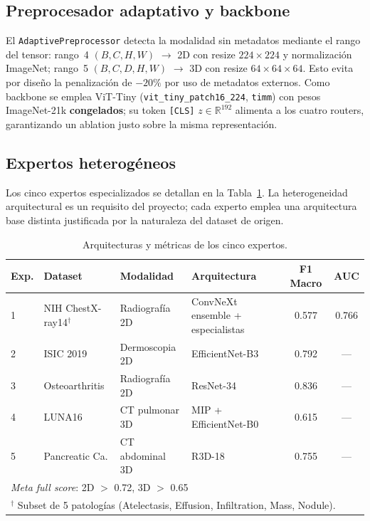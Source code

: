 \documentclass[11pt, a4paper]{article}
\begin{document}
\subsection{Preprocesador adaptativo y backbone}

El \texttt{AdaptivePreprocessor} detecta la modalidad sin metadatos mediante
el rango del tensor: rango~4 $(B,C,H,W)$ $\to$ 2D con resize $224{\times}224$
y normalización ImageNet; rango~5 $(B,C,D,H,W)$ $\to$ 3D con resize
$64{\times}64{\times}64$. Esto evita por diseño la penalización de $-20\%$
por uso de metadatos externos. Como backbone se emplea ViT-Tiny
(\texttt{vit\_tiny\_patch16\_224}, \texttt{timm}) con pesos ImageNet-21k
\textbf{congelados}; su token \texttt{[CLS]} $z \in \mathbb{R}^{192}$
alimenta a los cuatro routers, garantizando un ablation justo sobre la misma
representación.

\subsection{Expertos heterogéneos}

Los cinco expertos especializados se detallan en la Tabla~\ref{tab:expertos}.
La heterogeneidad arquitectural es un requisito del proyecto; cada experto
emplea una arquitectura base distinta justificada por la naturaleza del
dataset de origen.

\begin{table}[H]
\centering
\caption{Arquitecturas y métricas de los cinco expertos.}
\label{tab:expertos}
\footnotesize
\begin{tabular}{llllcc}
\toprule
\textbf{Exp.} & \textbf{Dataset} & \textbf{Modalidad} & \textbf{Arquitectura} & \textbf{F1 Macro} & \textbf{AUC} \\
\midrule
1 & NIH ChestX-ray14$^\dagger$ & Radiografía 2D & ConvNeXt ensemble + especialistas & 0.577 & 0.766 \\
2 & ISIC 2019        & Dermoscopia 2D & EfficientNet-B3 & 0.792 & —     \\
3 & Osteoarthritis   & Radiografía 2D & ResNet-34       & 0.836 & —     \\
4 & LUNA16           & CT pulmonar 3D & MIP + EfficientNet-B0 & 0.615 & — \\
5 & Pancreatic Ca.   & CT abdominal 3D & R3D-18         & 0.755 & —     \\
\midrule
\multicolumn{4}{l}{\textit{Meta full score}: 2D $>$ 0.72, 3D $>$ 0.65} & \multicolumn{2}{c}{} \\
\bottomrule
\multicolumn{6}{l}{\footnotesize $^\dagger$ Subset de 5 patologías (Atelectasis, Effusion, Infiltration, Mass, Nodule).} \\
\end{tabular}
\end{table}
\end{document}
